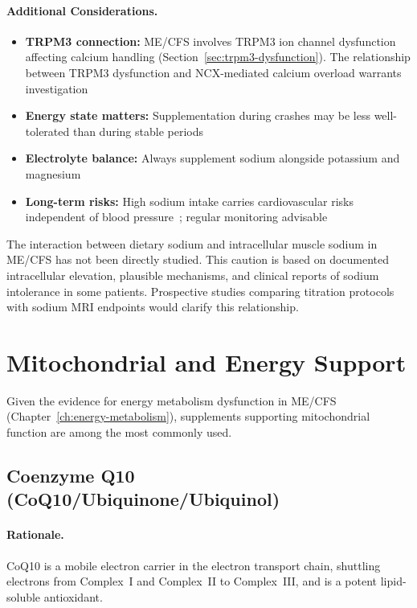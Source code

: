 \paragraph{Additional Considerations.}
\begin{itemize}
    \item \textbf{TRPM3 connection:} ME/CFS involves TRPM3 ion channel dysfunction affecting calcium handling (Section~\ref{sec:trpm3-dysfunction}). The relationship between TRPM3 dysfunction and NCX-mediated calcium overload warrants investigation
    \item \textbf{Energy state matters:} Supplementation during crashes may be less well-tolerated than during stable periods
    \item \textbf{Electrolyte balance:} Always supplement sodium alongside potassium and magnesium
    \item \textbf{Long-term risks:} High sodium intake carries cardiovascular risks independent of blood pressure~\cite{Stock2022sodium}; regular monitoring advisable
\end{itemize}

\begin{observation}
The interaction between dietary sodium and intracellular muscle sodium in ME/CFS has not been directly studied. This caution is based on documented intracellular elevation, plausible mechanisms, and clinical reports of sodium intolerance in some patients. Prospective studies comparing titration protocols with sodium MRI endpoints would clarify this relationship.
\end{observation}


\section{Mitochondrial and Energy Support}
\label{sec:mito-support}

Given the evidence for energy metabolism dysfunction in ME/CFS (Chapter~\ref{ch:energy-metabolism}), supplements supporting mitochondrial function are among the most commonly used.

\subsection{Coenzyme Q10 (CoQ10/Ubiquinone/Ubiquinol)}

\paragraph{Rationale.} CoQ10 is a mobile electron carrier in the electron transport chain, shuttling electrons from Complex~I and Complex~II to Complex~III, and is a potent lipid-soluble antioxidant.

